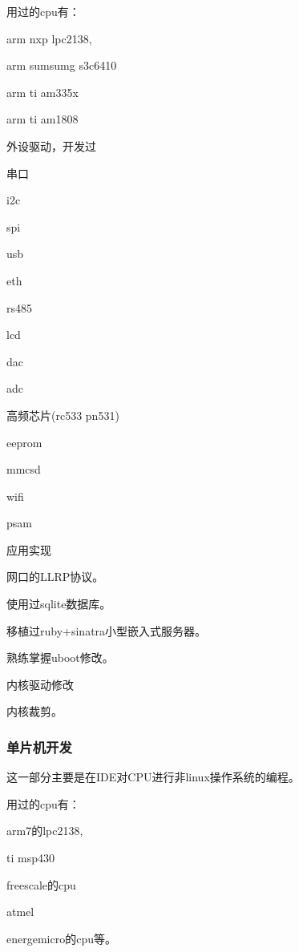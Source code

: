 \documentclass[titlepage]{article}
\begin{document}
用过的cpu有：

\begin{compactitem}
    \item arm nxp lpc2138, 
    \item arm sumsumg s3c6410
    \item arm ti am335x
    \item arm ti am1808
\end{compactitem}

外设驱动，开发过

\begin{compactitem}
    \item 串口
    \item i2c
    \item spi
    \item usb
    \item eth
    \item rs485
    \item lcd
    \item dac
    \item adc
    \item 高频芯片(rc533 pn531)
    \item eeprom
    \item mmcsd
    \item wifi
    \item psam
\end{compactitem}

应用实现

\begin{compactitem}
    \item 网口的LLRP协议。
    \item 使用过sqlite数据库。
    \item 移植过ruby+sinatra小型嵌入式服务器。
    \item 熟练掌握uboot修改。
    \item 内核驱动修改
    \item 内核裁剪。
\end{compactitem}



\subsubsection{单片机开发}

这一部分主要是在IDE对CPU进行非linux操作系统的编程。

用过的cpu有：

\begin{compactitem}
    \item arm7的lpc2138,
    \item ti msp430
    \item freescale的cpu
    \item atmel
    \item energemicro的cpu等。
\end{compactitem}
\end{document}

